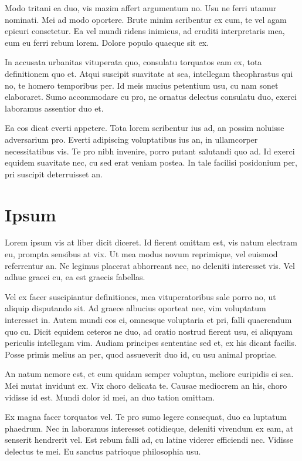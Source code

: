 Modo tritani ea duo, vis mazim affert argumentum no. Usu ne ferri utamur nominati. Mei ad modo oportere. Brute minim scribentur ex cum, te vel agam epicuri consetetur. Ea vel mundi ridens inimicus, ad eruditi interpretaris mea, eum eu ferri rebum lorem. Dolore populo quaeque sit ex.

In accusata urbanitas vituperata quo, consulatu torquatos eam ex, tota definitionem quo et. Atqui suscipit suavitate at sea, intellegam theophrastus qui no, te homero temporibus per. Id meis mucius petentium usu, cu nam sonet elaboraret. Sumo accommodare cu pro, ne ornatus delectus consulatu duo, exerci laboramus assentior duo et.

Ea eos dicat everti appetere. Tota lorem scribentur ius ad, an possim noluisse adversarium pro. Everti adipiscing voluptatibus ius an, in ullamcorper necessitatibus vis. Te pro nibh invenire, porro putant salutandi quo ad. Id exerci equidem suavitate nec, cu sed erat veniam postea. In tale facilisi posidonium per, pri suscipit deterruisset an.


\section{Ipsum}
Lorem ipsum vis at liber dicit diceret. Id fierent omittam est, vis natum electram eu, prompta sensibus at vix. Ut mea modus novum reprimique, vel euismod referrentur an. Ne legimus placerat abhorreant nec, no deleniti interesset vis. Vel adhuc graeci cu, ea est graecis fabellas.

Vel ex facer suscipiantur definitiones, mea vituperatoribus sale porro no, ut aliquip disputando sit. Ad graece albucius oporteat nec, vim voluptatum interesset in. Autem mundi eos ei, omnesque voluptaria et pri, falli quaerendum quo cu. Dicit equidem ceteros ne duo, ad oratio nostrud fierent usu, ei aliquyam periculis intellegam vim. Audiam principes sententiae sed et, ex his dicant facilis. Posse primis melius an per, quod assueverit duo id, cu usu animal propriae.

An natum nemore est, et eum quidam semper voluptua, meliore euripidis ei sea. Mei mutat invidunt ex. Vix choro delicata te. Causae mediocrem an his, choro vidisse id est. Mundi dolor id mei, an duo tation omittam.

Ex magna facer torquatos vel. Te pro sumo legere consequat, duo ea luptatum phaedrum. Nec in laboramus interesset cotidieque, deleniti vivendum ex eam, at senserit hendrerit vel. Est rebum falli ad, cu latine viderer efficiendi nec. Vidisse delectus te mei. Eu sanctus patrioque philosophia usu.

